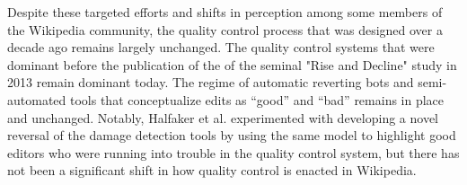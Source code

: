 Despite these targeted efforts and shifts in perception among some members of the Wikipedia community, the quality control process that was designed over a decade ago remains largely unchanged\cite{halfaker2014snuggle}.  The quality control systems that were dominant before the publication of the of the seminal "Rise and Decline" study in 2013\cite{halfaker2013rise} remain dominant today.  The regime of automatic reverting bots and semi-automated tools that conceptualize edits as ``good'' and ``bad'' remains in place and unchanged.  Notably, Halfaker et al. experimented with developing a novel reversal of the damage detection tools by using the same model to highlight good editors who were running into trouble in the quality control system\cite{halfaker2014snuggle}, but there has not been a significant shift in how quality control is enacted in Wikipedia.
